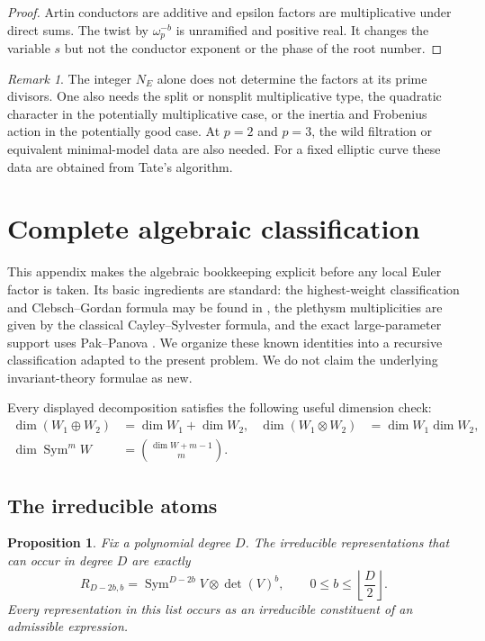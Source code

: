 \documentclass[11pt,reqno]{amsart}
\newtheorem{proposition}[theorem]{Proposition}
\theoremstyle{definition}
\theoremstyle{remark}
\newtheorem{remark}[theorem]{Remark}
\newcommand{\Sym}{\operatorname{Sym}}
\begin{document}
\begin{proof}
Artin conductors are additive and epsilon factors are multiplicative under
direct sums.  The twist by $\omega_p^{-b}$ is unramified and positive real.
It changes the variable $s$ but not the conductor exponent or the phase of
the root number.
\end{proof}

\begin{remark}\label{rem:level-not-enough}
The integer $N_E$ alone does not determine the factors at its prime divisors.
One also needs the split or nonsplit multiplicative type, the quadratic
character in the potentially multiplicative case, or the inertia and
Frobenius action in the potentially good case.  At $p=2$ and $p=3$, the wild
filtration or equivalent minimal-model data are also needed.  For a fixed
elliptic curve these data are obtained from Tate's algorithm.
\end{remark}

\appendix

\section{Complete algebraic classification}\label{app:algebra}

This appendix makes the algebraic bookkeeping explicit before any local
Euler factor is taken.  Its basic ingredients are standard: the
highest-weight classification and Clebsch--Gordan formula may be found in
\cite{FultonHarris}, the plethysm multiplicities are given by the classical
Cayley--Sylvester formula, and the exact large-parameter support uses
Pak--Panova \cite{PakPanova}.  We organize these known identities into a
recursive classification adapted to the present problem.  We do not claim
the underlying invariant-theory formulae as new.

Every displayed decomposition satisfies the following useful dimension
check:
\begin{align*}
 \dim(W_1\oplus W_2)&=\dim W_1+\dim W_2,&
 \dim(W_1\otimes W_2)&=\dim W_1\dim W_2,\\
 \dim\Sym^mW&=\binom{\dim W+m-1}{m}.&&
\end{align*}

\subsection{The irreducible atoms}

\begin{proposition}\label{prop:all-atoms}
Fix a polynomial degree $D$.  The irreducible representations that can occur
in degree $D$ are exactly
\begin{equation}\label{eq:degree-D-atoms}
 R_{D-2b,b}=\Sym^{D-2b}V\otimes\det(V)^b,
 \qquad
 0\leq b\leq\left\lfloor\frac D2\right\rfloor.
\end{equation}
Every representation in this list occurs as an irreducible constituent of an
admissible expression.
\end{proposition}
\end{document}
